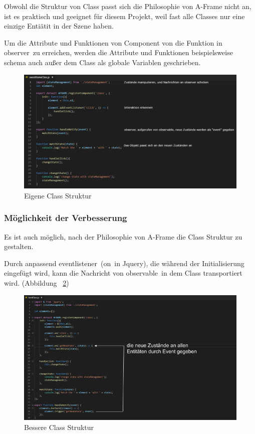  Obwohl die Struktur von Class passt sich die Philosophie von A-Frame nicht an, ist es praktisch und geeignet für diesem Projekt, weil fast alle Classes nur eine einzige Entiätit in der Szene haben.
 
 Um die Attribute und Funktionen von Component von die Funktion in \glqq observer\grqq\ zu erreichen, werden die Attribute und Funktionen beispielsweise schema auch außer dem Class als globale Variablen geschrieben.
 
\begin{figure}[ht]
\vspace*{0.3cm}
\centering
\includegraphics[width=\textwidth]{images/eigenesClass.png}
\caption[Eigene Class Struktur]{Eigene Class Struktur}
\label{fig:eigenesClass} 
\end{figure}
 
 \subsubsection{Möglichkeit der Verbesserung}
 Es ist auch möglich, nach der Philosophie von A-Frame die Class Struktur zu gestalten.
 
 Durch anpassend \glqq eventlistener\grqq\ (\glqq on\grqq\ in Jquery), die während der Initialisierung eingefügt wird, kann die Nachricht von \glqq observable\grqq\ in dem Class transportiert wird. (Abbildung ~\ref{fig:bestesClass})
 
\begin{figure}[ht]
\vspace*{0.3cm}
\centering
\includegraphics[width=\textwidth]{images/bestClass.png}
\caption[Bessere Class Struktur]{Bessere Class Struktur}
\label{fig:bestesClass} 
\end{figure}
 

